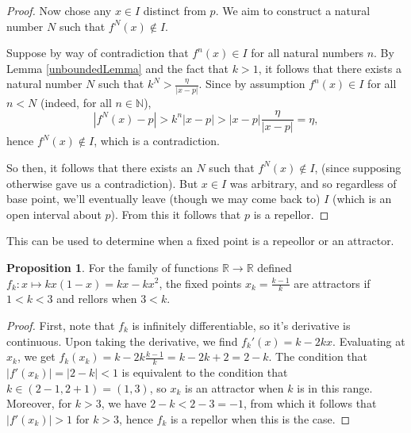 \documentclass[12pt, letterpaper]{article}
\newcommand{\R}{\mathbb{R}}
\newcommand{\N}{\mathbb{N}}
\theoremstyle{definition}
\newtheorem{proposition}{Proposition}
\begin{document}
\begin{proof}
    Now chose any $x\in I$ distinct from $p$. We aim to construct a natural number $N$ such that $f^N(x) \not \in I$. 

    Suppose by way of contradiction that $f^n(x)\in I$ for all natural numbers $n$. By Lemma \ref{unboundedLemma} and the fact that $k > 1$, it follows that 
    there exists a natural number $N$ such that $k^N > \frac{\eta}{|x - p|}$. Since by assumption $f^n(x)\in I$ for all $n < N$ (indeed, for all $n\in \N$),
    \[
        |f^N(x) - p| > k^n|x - p| > |x-p|\frac{\eta}{|x-p|} = \eta,
        \]
    hence $f^N(x)\not\in I$, which is a contradiction.

    So then, it follows that there exists an $N$ such that $f^N(x)\not\in I$, (since supposing otherwise gave us a contradiction).
    But $x\in I$ was arbitrary, and so regardless of base point, we'll eventually leave (though we may come back to) $I$ (which is an open interval about $p$). 
    From this it follows that $ p $ is a repellor.
\end{proof} 

This can be used to determine when a fixed point is a repeollor or an attractor.

\begin{proposition}
    For the family of functions $\R\to \R$ defined $f_k:x\mapsto kx(1-x) = kx - kx^2$, the fixed points $x_k = \frac{k-1}{k}$ are attractors if $1 < k < 3$ and rellors when $ 3 < k $.
\end{proposition}

\begin{proof}
    First, note that $f_k$ is infinitely differentiable, so it's derivative is continuous. Upon taking the derivative, we find $f_k'(x) = k- 2kx$. Evaluating at $ x_k $, we get $ f_k(x_k) = k - 2k\frac{k-1}{k} = k - 2k + 2 = 2 - k $.
    The condition that $ |f'(x_k)| = |2- k| < 1 $ is equivalent to the condition that $k \in (2 - 1, 2 + 1) = (1,3)$, so $x_k$ is an attractor when $k$ is in this range. Moreover, for $k > 3$, we have $ 2 - k < 2 - 3 = -1$,
    from which it follows that $|f'(x_k)| > 1$ for $k > 3$, hence $f_k$ is a repellor when this is the case.
\end{proof}
\end{document}
